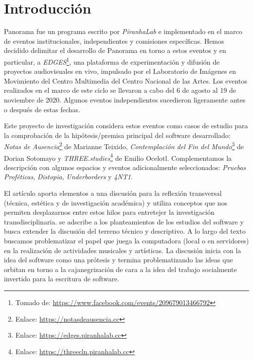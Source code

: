 
\section*{Introducción}

Panorama fue un programa escrito por \textit{PiranhaLab} e implementado en el marco de eventos institucionales, independientes y comisiones específicas. Hemos decidido delimitar el desarrollo de Panorama en torno a estos eventos y en particular, a \textit{EDGES}\footnote{Tomado de: \url{https://www.facebook.com/events/209679013466792}}, una plataforma de experimentación y difusión de proyectos audiovisuales en vivo, impulsado por el Laboratorio de Imágenes en Movimiento del Centro Multimedia del Centro Nacional de las Artes. Los eventos realizados en el marco de este ciclo se llevaron a cabo del 6 de agosto al 19 de noviembre de 2020. Algunos eventos independientes sucedieron ligeramente antes o después de estas fechas. 	

Este proyecto de investigación considera estos eventos como casos de estudio para la comprobación de la hipótesis/premisa principal del software desarrollado: \textit{Notas de Ausencia}\footnote{Enlace: \url{https://notasdeausencia.cc}} de Marianne Teixido, \textit{Contemplación del Fin del Mundo}\footnote{Enlace: \url{https://edges.piranhalab.cc}} de Dorian Sotomayo y \textit{THREE.studies}\footnote{Enlace: \url{https://threecln.piranhalab.cc}} de Emilio Ocelotl. Complementamos la descripción con algunos espacios y eventos adicionalmente seleccionados: \textit{Pruebas Proféticas}, \textit{Distopia}, \textit{Underborders} y \textit{4NT1}. %

El artículo aporta elementos a una discusión para la reflexión transversal (técnica, estética y  de investigación académica) y utiliza conceptos que nos permiten desplazarnos entre estos hilos para entretejer la investigación transdisciplinaria. se adscribe a los planteamientos de los estudios del software y busca extender la discusión del terreno técnico y descriptivo. A lo largo del texto buscamos problematizar el papel que juega la computadora (local o en servidores) en la realización de actividades musicales y artísticas. La discusión inicia con la idea del software como una prótesis y termina problematizando las ideas que orbitan en torno a la cajanegrización de cara a la idea del trabajo socialmente invertido para la escritura de software.  


